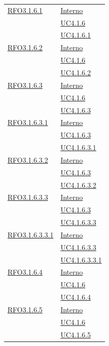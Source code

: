 \begin{longtable}{|>{\centering}m{5cm}|m{5cm}<{\centering}|}
\hyperlink{RFO3.1.6.1}{RFO3.1.6.1} & \hyperlink{Interno}{Interno}\\
& \hyperref[UC4.1.6]{UC4.1.6}\\
& \hyperref[UC4.1.6.1]{UC4.1.6.1}\\ \hline

\hyperlink{RFO3.1.6.2}{RFO3.1.6.2} & \hyperlink{Interno}{Interno}\\
& \hyperref[UC4.1.6]{UC4.1.6}\\
& \hyperref[UC4.1.6.2]{UC4.1.6.2}\\ \hline

\hyperlink{RFO3.1.6.3}{RFO3.1.6.3} & \hyperlink{Interno}{Interno}\\
& \hyperref[UC4.1.6]{UC4.1.6}\\
& \hyperref[UC4.1.6.3]{UC4.1.6.3}\\ \hline

\hyperlink{RFO3.1.6.3.1}{RFO3.1.6.3.1} & \hyperlink{Interno}{Interno}\\
& \hyperref[UC4.1.6.3]{UC4.1.6.3}\\
& \hyperref[UC4.1.6.3.1]{UC4.1.6.3.1}\\ \hline

\hyperlink{RFO3.1.6.3.2}{RFO3.1.6.3.2} & \hyperlink{Interno}{Interno}\\
& \hyperref[UC4.1.6.3]{UC4.1.6.3}\\
& \hyperref[UC4.1.6.3.2]{UC4.1.6.3.2}\\ \hline

\hyperlink{RFO3.1.6.3.3}{RFO3.1.6.3.3} & \hyperlink{Interno}{Interno}\\
& \hyperref[UC4.1.6.3]{UC4.1.6.3}\\
& \hyperref[UC4.1.6.3.3]{UC4.1.6.3.3}\\ \hline

\hyperlink{RFO3.1.6.3.3.1}{RFO3.1.6.3.3.1} & \hyperlink{Interno}{Interno}\\
& \hyperref[UC4.1.6.3.3]{UC4.1.6.3.3}\\
& \hyperref[UC4.1.6.3.3.1]{UC4.1.6.3.3.1}\\ \hline

\hyperlink{RFO3.1.6.4}{RFO3.1.6.4} & \hyperlink{Interno}{Interno}\\
& \hyperref[UC4.1.6]{UC4.1.6}\\
& \hyperref[UC4.1.6.4]{UC4.1.6.4}\\ \hline

\hyperlink{RFO3.1.6.5}{RFO3.1.6.5} & \hyperlink{Interno}{Interno}\\
& \hyperref[UC4.1.6]{UC4.1.6}\\
& \hyperref[UC4.1.6.5]{UC4.1.6.5}\\ \hline


\end{longtable}
